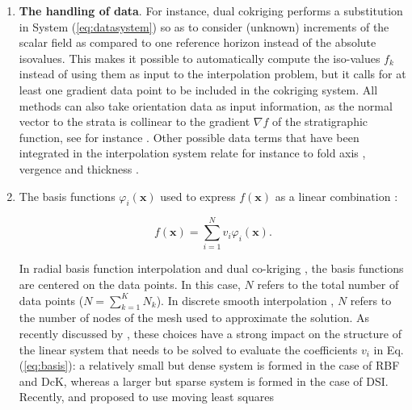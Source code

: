 \documentclass[final]{ring20}
\begin{document}
\begin{enumerate}
\item \textbf{The handling of data}. For instance, dual cokriging \citep[DcK, ][]{Lajaunie1997MG,Chiles04OMSMP,Calcagno2008PEPI} performs a substitution in System (\ref{eq:datasystem}) so as to consider (unknown) increments of the scalar field as compared to one reference horizon instead of the absolute isovalues. This makes it possible to automatically compute the iso-values $f_k$ instead of using them as input to the interpolation problem, but it calls for at least one gradient data point to be included in the cokriging system. All methods can also take orientation data as input information, as the normal vector to the strata is collinear to the gradient $\nabla f$ of the stratigraphic function, see for instance \citet{Frank2007CG,Hillier2014MG}. Other possible data terms that have been integrated in the interpolation system relate for instance to fold axis \citep{MassiotGM2010,Hillier2014MG}, vergence \citep{Laurent2016EaPSL,Grose2017JSG} and thickness \citep{Laurent2016MG}.

\item The basis functions $\varphi_i(\mathbf{x})$ used to express $f(\mathbf{x})$ as a linear combination \citep[e.g., ][]{Renaudeau2019MG,Wellmann2018AiG}: 

\begin{equation}
\label{eq:basis}
  f(\mathbf{x}) = \sum_{i=1}^{N}{v_i\varphi_i(\mathbf{x})}.
\end{equation}

In radial basis function interpolation \citep[RBF, ][]{Cowan2002ASGMEM,Hillier2014MG} and dual co-kriging \citep[][]{Calcagno2008PEPI}, the basis functions are centered on the data points. In this case, $N$ refers to the total number of data points ($N = \sum_{k=1}^{K}{N_k}$). In discrete smooth interpolation \citep[DSI, ][]{Frank2007CG,Caumon2013GaRSITo,Souche20137ECEISE2,Irakarama2018EAGE}, $N$ refers to the number of nodes of the mesh used to approximate the solution. As recently discussed by \citet{Renaudeau2019MG}, these choices have a strong impact on the structure of the linear system that needs to be solved to evaluate the coefficients $v_i$ in Eq. (\ref{eq:basis}): a relatively small but dense system is formed in the case of RBF and DcK, whereas a larger but sparse system is formed in the case of DSI. Recently, \citet{Renaudeau2019MG} and \citet{Manchuk2019C&G} proposed to use moving least squares 


\end{enumerate}
\end{document}
